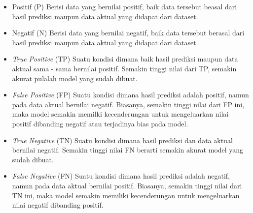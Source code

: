 \begin{itemize}[nolistsep]
    \item Positif (P)
          Berisi data yang bernilai positif, baik data tersebut beasal dari hasil prediksi maupun data aktual 
          yang didapat dari dataset.

    \item Negatif (N)
          Berisi data yang bernilai negatif, baik data tersebut berasal dari hasil prediksi maupun data aktual 
          yang didapat dari dataset.

    \item \textit{True Positive} (TP)
          Suatu kondisi dimana baik hasil prediksi maupun data aktual sama - sama bernilai positif. Semakin 
          tinggi nilai dari TP, semakin akurat pulalah model yang sudah dibuat.

    \item \textit{False Positive} (FP)
          Suatu kondisi dimana hasil prediksi adalah positif, namun pada data aktual bernilai negatif. 
          Biasanya, semakin tinggi nilai dari FP ini, maka model semakin memilki kecenderungan untuk 
          mengeluarkan nilai positif dibanding negatif atau terjadinya bias pada model.

    \item \textit{True Negative} (TN)
          Suatu kondisi dimana hasil prediksi dan data aktual bernilai negatif. Semakin tinggi nilai FN 
          berarti semakin akurat model yang sudah dibuat.

    \item \textit{False Negative} (FN)
          Suatu kondisi dimana hasil prediksi adalah negatif, namun pada data aktual bernilai positif. 
          Biasanya, semakin tinggi nilai dari TN ini, maka model semakin memiliki kecenderungan untuk 
          mengeluarkan nilai negatif dibanding positif.

\end{itemize}




